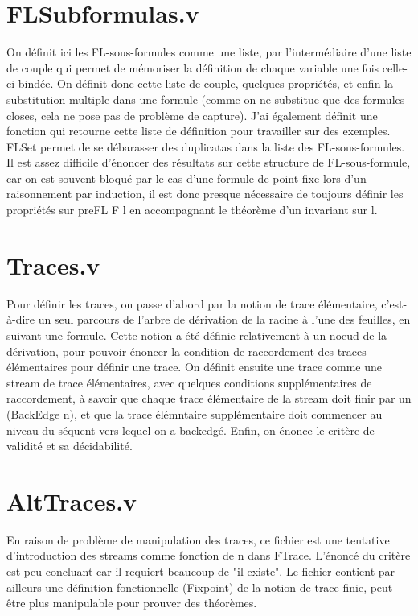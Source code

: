\documentclass[12pt]{article}
\theoremstyle{break}
\begin{document}
\section{FLSubformulas.v}
On définit ici les FL-sous-formules comme une liste, par l'intermédiaire d'une liste de couple qui permet de mémoriser la définition de chaque
variable une fois celle-ci bindée. On définit donc cette liste de couple, quelques propriétés, et enfin la substitution multiple dans une formule 
(comme on ne substitue que des formules closes, cela ne pose pas de problème de capture).
J'ai également définit une fonction qui retourne cette liste de définition pour travailler sur des exemples.
FLSet permet de se débarasser des duplicatas dans la liste des FL-sous-formules.
Il est assez difficile d'énoncer des résultats sur cette structure de FL-sous-formule, car on est souvent bloqué par le cas d'une formule de point
fixe lors d'un raisonnement par induction, il est donc presque nécessaire de toujours définir les propriétés sur preFL F l en accompagnant le théorème
d'un invariant sur l.

\section{Traces.v}
Pour définir les traces, on passe d'abord par la notion de trace élémentaire, c'est-à-dire un seul parcours de l'arbre de dérivation de la racine
à l'une des feuilles, en suivant une formule. Cette notion a été définie relativement à un noeud de la dérivation, pour pouvoir énoncer la condition
de raccordement des traces élémentaires pour définir une trace.
On définit ensuite une trace comme une stream de trace élémentaires, avec quelques conditions supplémentaires de raccordement, à savoir que 
chaque trace élémentaire de la stream doit finir par un (BackEdge n), et que la trace élémntaire supplémentaire doit commencer au niveau du
séquent vers lequel on a backedgé.
Enfin, on énonce le critère de validité et sa décidabilité.

\section{AltTraces.v}
En raison de problème de manipulation des traces, ce fichier est une tentative d'introduction des streams comme fonction de n dans FTrace. L'énoncé
du critère est peu concluant car il requiert beaucoup de "il existe". Le fichier contient par ailleurs une définition fonctionnelle (Fixpoint) de la notion
de trace finie, peut-être plus manipulable pour prouver des théorèmes.
\end{document}
